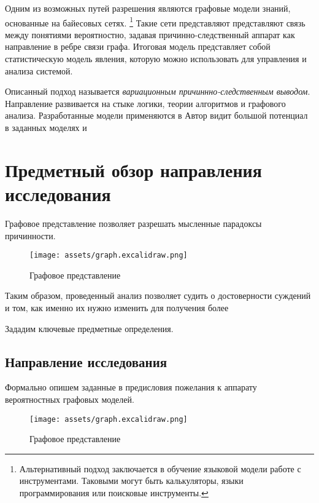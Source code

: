 \documentclass{article}
\begin{document}
Одним из возможных путей разрешения являются графовые модели знаний, основанные 
на байесовых сетях. \footnote{Альтернативный подход заключается в обучение языковой модели работе с инструментами. Таковыми могут быть калькуляторы,
языки программирования или поисковые инструменты.} Такие сети представляют представляют связь между понятиями вероятностно, 
задавая причинно-следственный аппарат как направление в ребре связи графа. 
Итоговая модель представляет собой статистическую модель явления, которую можно использовать для
управления и анализа системой. 

Описанный подход называется \textit{вариационным причиннно-следственным выводом}. Направление развивается на стыке логики,
теории алгоритмов и графового анализа. Разработанные модели применяются в  
Автор видит большой потенциал в заданных моделях и 

\section{Предметный обзор направления исследования}


Графовое представление позволяет разрешать мысленные парадоксы причинности.

\begin{figure}[h]
    \centering
    \texttt{[image: assets/graph.excalidraw.png]}
    \caption{Графовое представление}
    \label{graph}
\end{figure}





Таким образом, проведенный анализ позволяет судить о достоверности суждений и том, как именно их нужно изменить 
для получения более

Зададим ключевые предметные определения.

\subsection{Направление исследования} 


Формально опишем заданные в предисловия пожелания к аппарату вероятностных графовых моделей.


\begin{figure}[h]
    \centering
    \texttt{[image: assets/graph.excalidraw.png]}
    \caption{Графовое представление}
    \label{graph}
\end{figure}
\end{document}

